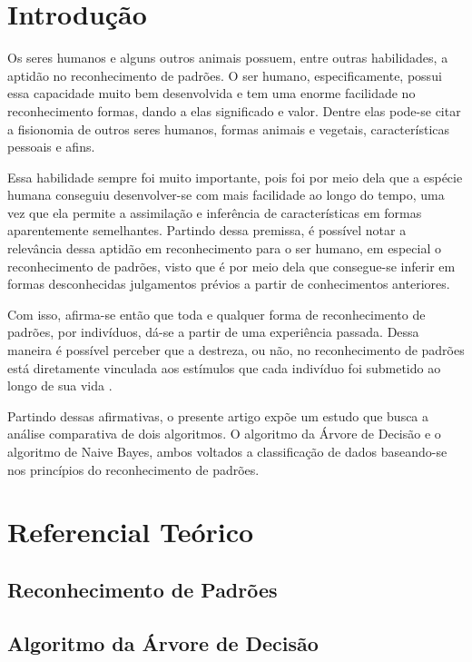 \documentclass[preprint,12pt,times]{elsarticle}
\begin{document}
	\section{Introdução}
	\label{Introdução}
	Os seres humanos e alguns outros animais possuem, entre outras habilidades, a aptidão no reconhecimento de padrões. O ser humano, especificamente, possui essa capacidade muito bem desenvolvida e tem uma enorme facilidade no reconhecimento formas, dando a elas significado e valor. Dentre elas pode-se citar a fisionomia de outros seres humanos, formas animais e vegetais, características pessoais e afins.

	Essa habilidade sempre foi muito importante, pois foi por meio dela que a espécie humana conseguiu desenvolver-se com mais facilidade ao longo do tempo, uma vez que ela permite a assimilação e inferência de características em formas aparentemente semelhantes. Partindo dessa premissa, é possível notar a relevância dessa aptidão em reconhecimento para o ser humano, em especial o reconhecimento de padrões, visto que é por meio dela que consegue-se inferir em formas desconhecidas julgamentos prévios a partir de conhecimentos anteriores.

	Com isso, afirma-se então que toda e qualquer forma de reconhecimento de padrões, por indivíduos, dá-se a partir de uma experiência passada. Dessa maneira é possível perceber que a destreza, ou não, no reconhecimento de padrões está diretamente vinculada aos estímulos que cada indivíduo foi submetido ao longo de sua vida \cite{Prado:2008}.

	Partindo dessas afirmativas, o presente artigo expõe um estudo que busca a análise comparativa de dois algoritmos. O algoritmo da Árvore de Decisão e o algoritmo de Naive Bayes, ambos voltados a classificação de dados baseando-se nos princípios do reconhecimento de padrões.

	\section{Referencial Teórico}
	\label{Referencial Teórico}

	\subsection{Reconhecimento de Padrões}

	\subsection{Algoritmo da Árvore de Decisão}
\end{document}
